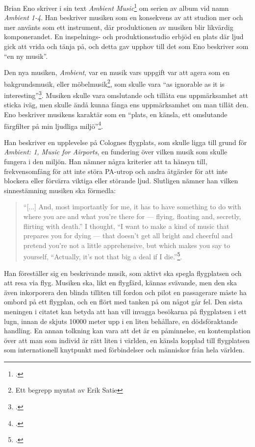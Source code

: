 \documentclass{article}
\begin{document}

Brian Eno skriver i sin text \emph{Ambient Music}\footcite[149-153]{Eno} om serien av album vid namn
\emph{Ambient 1-4}. Han beskriver musiken som en konsekvens av att studion mer och mer använts som ett
instrument, där produktionen av musiken blir likvärdig komponerandet. En inspelnings- och produktionsstudio
erbjöd en plats där ljud gick att vrida och tänja på, och detta gav upphov till det som Eno beskriver som ``en
ny musik''.

Den nya musiken, \emph{Ambient}, var en musik vars uppgift var att agera som en bakgrundsmusik, eller
möbelmusik\footnote{Ett begrepp myntat av Erik Satie}, som skulle vara ``as ignorable as it is
interesting''\footcite{Airports}. Musiken skulle vara omslutande och tillåta ens uppmärksamhet att sticka
iväg, men skulle ändå kunna fånga ens uppmärksamhet om man tillät den. Eno beskriver musikens karaktär som en
``plats, en känsla, ett omslutande färgfilter på min ljudliga miljö''\footcite[Egen översättning, s. 151]{Eno}.

Han beskriver en upplevelse på Colognes flygplats, som skulle ligga till grund för \emph{Ambient: 1, Music for
Airports}, en fundering över vilken musik som skulle fungera i den miljön. Han nämner några kriterier att ta
hänsyn till, frekvensomfång för att inte störa PA-utrop och andra åtgärder för att inte blockera eller
förvärra viktiga eller störande ljud. Slutligen nämner han vilken sinnestämning musiken ska förmedla:

\begin{quote}
``[...] And, most importantly for me, it has to have something to do with where you are and what you're there
for --- flying, floating and, secretly, flirting with death.'' I thought, ``I want to make a kind of music
that prepares you for dying --- that doesn't get all bright and cheerful and pretend you're not a little
apprehensive, but which makes you say to yourself, ``Actually, it’s not that big a deal if I
die.''\footcite[152]{Eno}.
\end{quote}
Han föreställer sig en beskrivande musik, som aktivt ska spegla flygplatsen och att resa via flyg. Musiken
ska, likt en flygfärd, kännas svävande, men den ska även inkorporera den blinda tilliten till fordon och pilot
en passagerare måste ha ombord på ett flygplan, och en flört med tanken på om något går fel. Den sista meningen i
citatet kan betyda att han vill invagga besökarna på flygplatsen i ett lugn, innan de skjuts 10000 meter upp 
i en liten behållare, en dödsföraktande handling. En annan tolkning kan vara att det är en påminnelse, en
kontemplation över att man som individ är rätt liten i världen, en känsla kopplad till flygplatsen som 
internationell knytpunkt med förbindelser och människor från hela världen. 
\end{document}
